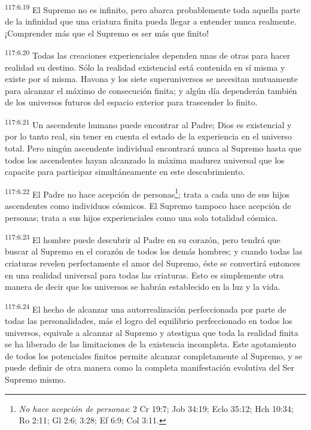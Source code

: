\par
\textsuperscript{117:6.19} El Supremo no es infinito, pero abarca probablemente toda aquella parte de la infinidad que una criatura finita pueda llegar a entender nunca realmente. ¡Comprender más que el Supremo es ser más que finito!

\par
\textsuperscript{117:6.20} Todas las creaciones experienciales dependen unas de otras para hacer realidad su destino. Sólo la realidad existencial está contenida en sí misma y existe por sí misma. Havona y los siete superuniversos se necesitan mutuamente para alcanzar el máximo de consecución finita; y algún día dependerán también de los universos futuros del espacio exterior para trascender lo finito.

\par
\textsuperscript{117:6.21} Un ascendente humano puede encontrar al Padre; Dios es existencial y por lo tanto real, sin tener en cuenta el estado de la experiencia en el universo total. Pero ningún ascendente individual encontrará nunca al Supremo hasta que todos los ascendentes hayan alcanzado la máxima madurez universal que los capacite para participar simultáneamente en este descubrimiento.

\par
\textsuperscript{117:6.22} El Padre no hace acepción de personas\footnote{\textit{No hace acepción de personas}: 2 Cr 19:7; Job 34:19; Eclo 35:12; Hch 10:34; Ro 2:11; Gl 2:6; 3:28; Ef 6:9; Col 3:11.}; trata a cada uno de sus hijos ascendentes como individuos cósmicos. El Supremo tampoco hace acepción de personas; trata a sus hijos experienciales como una sola totalidad cósmica.

\par
\textsuperscript{117:6.23} El hombre puede descubrir al Padre en su corazón, pero tendrá que buscar al Supremo en el corazón de todos los demás hombres; y cuando todas las criaturas revelen perfectamente el amor del Supremo, éste se convertirá entonces en una realidad universal para todas las criaturas. Esto es simplemente otra manera de decir que los universos se habrán establecido en la luz y la vida.

\par
\textsuperscript{117:6.24} El hecho de alcanzar una autorrealización perfeccionada por parte de todas las personalidades, más el logro del equilibrio perfeccionado en todos los universos, equivale a alcanzar al Supremo y atestigua que toda la realidad finita se ha liberado de las limitaciones de la existencia incompleta. Este agotamiento de todos los potenciales finitos permite alcanzar completamente al Supremo, y se puede definir de otra manera como la completa manifestación evolutiva del Ser Supremo mismo.

